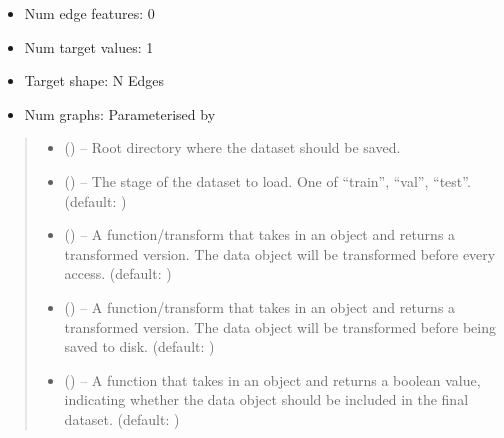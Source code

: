 \documentclass[letterpaper,10pt,english]{sphinxhowto}
\begin{document}
\begin{fulllineitems}
\begin{itemize}
\item {} 
\sphinxAtStartPar
Num edge features: 0

\item {} 
\sphinxAtStartPar
Num target values: 1

\item {} 
\sphinxAtStartPar
Target shape: N Edges

\item {} 
\sphinxAtStartPar
Num graphs: Parameterised by 

\end{itemize}
\begin{quote}\begin{description}
\begin{itemize}
\item {} 
\sphinxAtStartPar
{} () – Root directory where the dataset should be saved.

\item {} 
\sphinxAtStartPar
{} () – The stage of the dataset to load. One of “train”, “val”, “test”. (default: )

\item {} 
\sphinxAtStartPar
{} (\sphinxstyleliteralemphasis{\sphinxupquote{, }}) – A function/transform that takes in an  object and returns a transformed version. The data object will be transformed before every access. (default: )

\item {} 
\sphinxAtStartPar
{} (\sphinxstyleliteralemphasis{\sphinxupquote{, }}) – A function/transform that takes in an  object and returns a transformed version. The data object will be transformed before being saved to disk. (default: )

\item {} 
\sphinxAtStartPar
{} (\sphinxstyleliteralemphasis{\sphinxupquote{, }}) – A function that takes in an  object and returns a boolean value, indicating whether the data object should be included in the final dataset. (default: )


\end{itemize}
\end{description}
\end{quote}
\end{fulllineitems}
\end{document}
